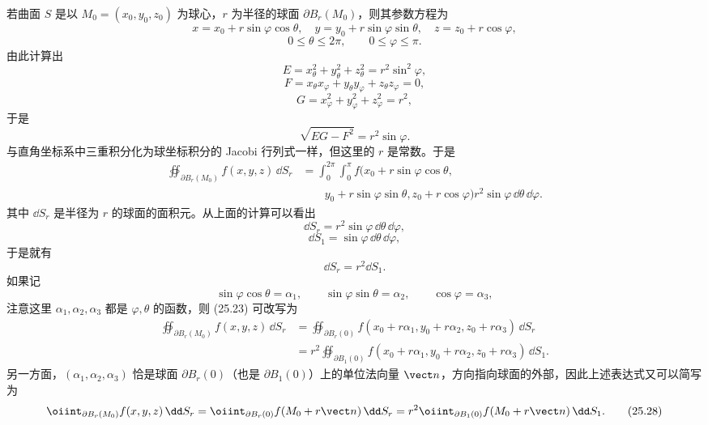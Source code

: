 若曲面 $S$ 是以 $M_0=(x_0,y_0,z_0)$ 为球心，$r$ 为半径的球面 $\partial B_r(M_0)$，则其参数方程为
\[
  x=x_0+r\sin\varphi\cos\theta,\quad
  y=y_0+r\sin\varphi\sin\theta,\quad
  z=z_0+r\cos\varphi,
\]
\[
  0\le\theta\le2\pi,\qquad0\le\varphi\le\pi.
\]
由此计算出
\[
  E=x_\theta^2+y_\theta^2+z_\theta^2=r^2\sin^2\varphi,
\]
\[
  F=x_\theta x_\varphi+y_\theta y_\varphi+z_\theta z_\varphi=0,
\]
\[
  G=x_\varphi^2+y_\varphi^2+z_\varphi^2=r^2,
\]
于是
\[
  \sqrt{EG-F^2}=r^2\sin\varphi.
\]
与直角坐标系中三重积分化为球坐标积分的 Jacobi 行列式一样，但这里的 $r$ 是常数。于是
\begin{equation}
\begin{aligned}
  \oiint_{\partial B_r(M_0)}f(x,y,z)\,\dd S_r
  &=\int_0^{2\pi}\int_0^\pi
  f(x_0+r\sin\varphi\cos\theta,\\
  &\qquad y_0+r\sin\varphi\sin\theta,
  z_0+r\cos\varphi)
  r^2\sin\varphi\,\dd\theta\,\dd\varphi.
\end{aligned}
  \tag{25.23}
\end{equation}
其中 $\dd S_r$ 是半径为 $r$ 的球面的面积元。从上面的计算可以看出
\begin{equation}
  \dd S_r=r^2\sin\varphi\,\dd\theta\,\dd\varphi,
  \tag{25.24}
\end{equation}
\begin{equation}
  \dd S_1=\sin\varphi\,\dd\theta\,\dd\varphi,
  \tag{25.25}
\end{equation}
于是就有
\begin{equation}
  \dd S_r=r^2\dd S_1.
  \tag{25.26}
\end{equation}
如果记
\[
  \sin\varphi\cos\theta=\alpha_1,\qquad
  \sin\varphi\sin\theta=\alpha_2,\qquad
  \cos\varphi=\alpha_3,
\]
注意这里 $\alpha_1,\alpha_2,\alpha_3$ 都是 $\varphi,\theta$ 的函数，则 (25.23) 可改写为
\begin{equation}
\begin{aligned}
  \oiint_{\partial B_r(M_0)}f(x,y,z)\,\dd S_r
  &=\oiint_{\partial B_r(0)}
  f(x_0+r\alpha_1,y_0+r\alpha_2,z_0+r\alpha_3)\,\dd S_r\\
  &=r^2\oiint_{\partial B_1(0)}
  f(x_0+r\alpha_1,y_0+r\alpha_2,z_0+r\alpha_3)\,\dd S_1.
\end{aligned}
  \tag{25.27}
\end{equation}
另一方面，$(\alpha_1,\alpha_2,\alpha_3)$ 恰是球面 $\partial B_r(0)$（也是 $\partial B_1(0)$）上的单位法向量 $\vect n$，方向指向球面的外部，因此上述表达式又可以简写为
\begin{equation}
  \oiint_{\partial B_r(M_0)}f(x,y,z)\,\dd S_r
  =\oiint_{\partial B_r(0)}f(M_0+r\vect n)\,\dd S_r
  =r^2\oiint_{\partial B_1(0)}f(M_0+r\vect n)\,\dd S_1.
  \tag{25.28}
\end{equation}

